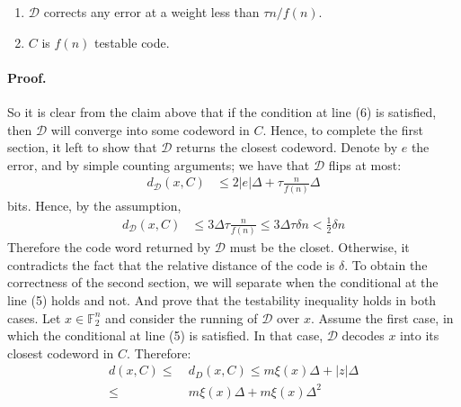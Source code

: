 \documentclass{article}
\begin{document}
\begin{multicols*}{2}
  \begin{enumerate}
    \item $\mathcal{D}$ corrects any error at a weight less than $\tau n / f\left(n\right)$.   
    \item $C$ is $f\left( n \right)$ testable code.
  \end{enumerate}


  \paragraph{Proof.} So it is clear from the claim above that if the condition at line (6) is satisfied, then $\mathcal{D}$  will converge into some codeword in $C$. Hence, to complete the first section, it left to show that $\mathcal{D}$ returns the closest codeword. Denote by $e$ the error, and by simple counting arguments; we have that $\mathcal{D}$ flips at most:  
  \begin{equation*}
    \begin{split}
      d_{\mathcal{D}}\left( x, C \right) & \le 2|e|\Delta + \tau \frac{n}{f\left( n \right)}\Delta
    \end{split}
  \end{equation*}
  bits. Hence, by the assumption, 
  \begin{equation*}
    \begin{split}
      d_{\mathcal{D}}\left( x, C \right) & \le 3\Delta \tau \frac{n}{f\left( n \right)} \le 3\Delta \tau\delta n < \frac{1}{2} \delta n  
    \end{split}
  \end{equation*}
  Therefore the code word returned by $\mathcal{D}$ must be the closet. Otherwise, it contradicts the fact that the relative distance of the code is $\delta$.
  To obtain the correctness of the second section, we will separate when the conditional at the line (5) holds and not. And prove that the testability inequality holds in both cases. 
  Let $x \in \mathbb{F}_{2}^{n}$ and consider the running of $\mathcal{D}$ over $x$. Assume the first case, in which the conditional at line (5) is satisfied. In that case, $\mathcal{D}$ decodes $x$ into its closest codeword in $C$. Therefore:
  \begin{equation*}
    \begin{split}
      d\left( x, C \right) \le & \ d_{D} \left( x, C \right) \le m\xi\left( x \right)\Delta +  |z|\Delta  \\ \le &  \  m\xi\left( x \right)\Delta + m\xi\left( x \right)  \Delta^{2} \\ 

\end{split}
\end{equation*}
\end{multicols*}
\end{document}
